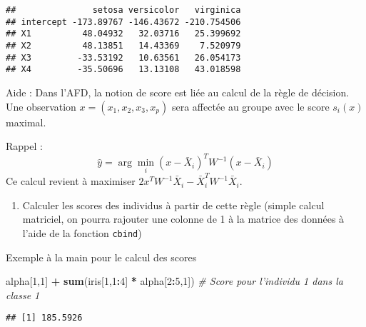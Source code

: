 \documentclass[
]{article}
\newenvironment{Shaded}{\begin{snugshade}}{\end{snugshade}}
\newcommand{\CommentTok}[1]{\textcolor[rgb]{0.56,0.35,0.01}{\textit{#1}}}
\newcommand{\DecValTok}[1]{\textcolor[rgb]{0.00,0.00,0.81}{#1}}
\newcommand{\KeywordTok}[1]{\textcolor[rgb]{0.13,0.29,0.53}{\textbf{#1}}}
\newcommand{\NormalTok}[1]{#1}
\newcommand{\OperatorTok}[1]{\textcolor[rgb]{0.81,0.36,0.00}{\textbf{#1}}}
\newcommand{\OtherTok}[1]{\textcolor[rgb]{0.56,0.35,0.01}{#1}}
\newcommand{\StringTok}[1]{\textcolor[rgb]{0.31,0.60,0.02}{#1}}
\providecommand{\tightlist}{%
  \setlength{\itemsep}{0pt}\setlength{\parskip}{0pt}}
\begin{document}
\begin{verbatim}
##               setosa versicolor   virginica
## intercept -173.89767 -146.43672 -210.754506
## X1          48.04932   32.03716   25.399692
## X2          48.13851   14.43369    7.520979
## X3         -33.53192   10.63561   26.054173
## X4         -35.50696   13.13108   43.018598
\end{verbatim}

Aide : Dans l'AFD, la notion de score est liée au calcul de la règle de
décision. Une observation \(x = (x_1, x_2, x_3, x_p)\) sera affectée au
groupe avec le score \(s_i(x)\) maximal.

Rappel : \[
\hat{y} = \arg\min_i (x - \bar{X}_i)^T W^{-1} (x - \bar{X}_i) 
\] Ce calcul revient à maximiser
\(2 x^T W^{-1} \bar{X}_i - \bar{X}_i^T W^{-1}\bar{X}_i\).

\begin{enumerate}
\def\labelenumi{\arabic{enumi}.}
\setcounter{enumi}{22}
\tightlist
\item
  Calculer les scores des individus à partir de cette règle (simple
  calcul matriciel, on pourra rajouter une colonne de 1 à la matrice des
  données à l'aide de la fonction \texttt{cbind})
\end{enumerate}

Exemple à la main pour le calcul des scores

\begin{Shaded}
\begin{Highlighting}[]
\NormalTok{alpha[}\DecValTok{1}\NormalTok{,}\DecValTok{1}\NormalTok{] }\OperatorTok{+}\StringTok{ }\KeywordTok{sum}\NormalTok{(iris[}\DecValTok{1}\NormalTok{,}\DecValTok{1}\OperatorTok{:}\DecValTok{4}\NormalTok{] }\OperatorTok{*}\StringTok{ }\NormalTok{alpha[}\DecValTok{2}\OperatorTok{:}\DecValTok{5}\NormalTok{,}\DecValTok{1}\NormalTok{]) }\CommentTok{# Score pour l'individu 1 dans la classe 1}
\end{Highlighting}
\end{Shaded}

\begin{verbatim}
## [1] 185.5926
\end{verbatim}

\begin{Shaded}
\end{Shaded}
\end{document}
